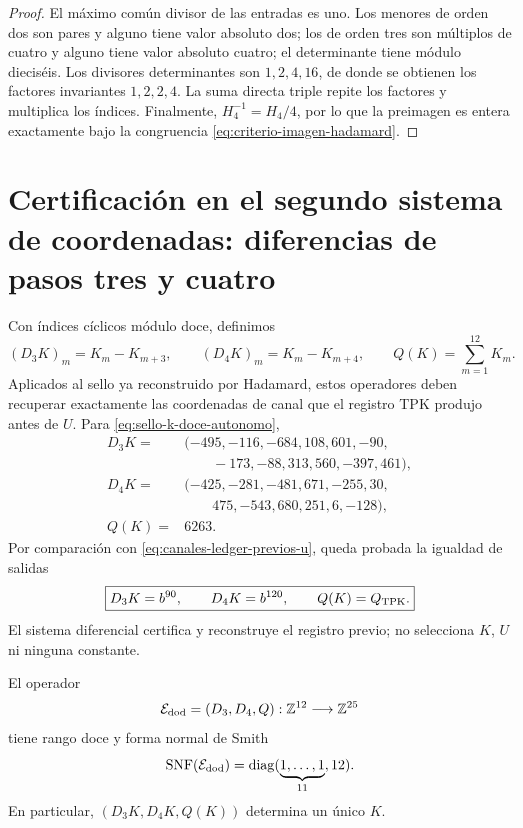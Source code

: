 \begin{proof}
El máximo común divisor de las entradas es uno. Los menores de orden dos son
pares y alguno tiene valor absoluto dos; los de orden tres son múltiplos de
cuatro y alguno tiene valor absoluto cuatro; el determinante tiene módulo
dieciséis. Los divisores determinantes son \(1,2,4,16\), de donde se obtienen
los factores invariantes \(1,2,2,4\). La suma directa triple repite los
factores y multiplica los índices. Finalmente,
\(H_4^{-1}=H_4/4\), por lo que la preimagen es entera exactamente bajo la
congruencia \eqref{eq:criterio-imagen-hadamard}.
\end{proof}

\section{Certificación en el segundo sistema de coordenadas: diferencias de pasos tres y cuatro}

Con índices cíclicos módulo doce, definimos
\begin{equation}
 (D_3K)_m=K_m-K_{m+3},
 \qquad
 (D_4K)_m=K_m-K_{m+4},
 \qquad
 Q(K)=\sum_{m=1}^{12}K_m.
 \label{eq:extractor-diferencias-k}
\end{equation}
Aplicados al sello ya reconstruido por Hadamard, estos operadores deben
recuperar exactamente las coordenadas de canal que el registro TPK produjo
antes de \(U\). Para \eqref{eq:sello-k-doce-autonomo},
\begin{align*}
 D_3K={}&(-495,-116,-684,108,601,-90,\\
         &\qquad-173,-88,313,560,-397,461),\\
 D_4K={}&(-425,-281,-481,671,-255,30,\\
         &\qquad475,-543,680,251,6,-128),\\
 Q(K)={}&6263.
\end{align*}
Por comparación con \eqref{eq:canales-ledger-previos-u}, queda probada la
igualdad de salidas
\begin{equation}
 \boxed{
 D_3K=b^{90},\qquad D_4K=b^{120},\qquad Q(K)=Q_{\rm TPK}.}
 \label{eq:certificacion-canales-ledger-desde-k}
\end{equation}
El sistema diferencial certifica y reconstruye el registro previo; no
selecciona \(K\), \(U\) ni ninguna constante.

\begin{theorem}
\label{thm:completitud-extractor-transversal-k}
El operador
\[
 \mathcal E_{\rm dod}=(D_3,D_4,Q):
 \mathbb Z^{12}\longrightarrow\mathbb Z^{25}
\]
tiene rango doce y forma normal de Smith
\begin{equation}
 \operatorname{SNF}(\mathcal E_{\rm dod})
 =\operatorname{diag}(\underbrace{1,\ldots,1}_{11},12).
 \label{eq:snf-extractor-transversal-k}
\end{equation}
En particular, \((D_3K,D_4K,Q(K))\) determina un único \(K\).
\end{theorem}

